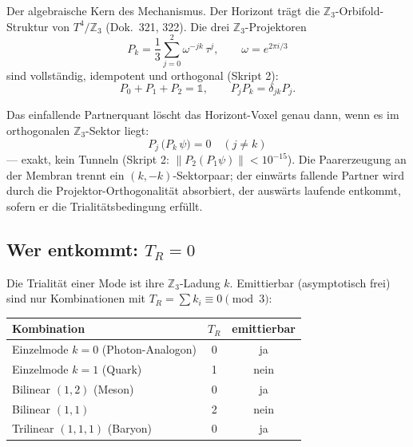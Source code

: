 Der algebraische Kern des Mechanismus. Der Horizont trägt die
$\mathbb{Z}_3$-Orbifold-Struktur von $T^4/\mathbb{Z}_3$ (Dok.\ 321, 322).
Die drei $\mathbb{Z}_3$-Projektoren
\begin{equation}
  P_k = \frac{1}{3}\sum_{j=0}^{2}\omega^{-jk}\,\tau^j,
  \qquad \omega = e^{2\pi i/3}
\end{equation}
sind vollständig, idempotent und orthogonal (Skript 2):
\begin{equation}
  P_0 + P_1 + P_2 = \mathbb{1},\qquad
  P_j P_k = \delta_{jk}P_j.
\end{equation}

\begin{tcolorbox}[ffgftbox, title={Die Absorption \B}]
  Das einfallende Partnerquant löscht das Horizont-Voxel genau dann,
  wenn es im orthogonalen $\mathbb{Z}_3$-Sektor liegt:
  \begin{equation}
    P_j\,\bigl(P_k\,\psi\bigr) = 0 \quad (j \neq k)
  \end{equation}
  — exakt, kein Tunneln (Skript 2: $\|P_2(P_1\psi)\| < 10^{-15}$).
  Die Paarerzeugung an der Membran trennt ein $(k,-k)$-Sektorpaar;
  der einwärts fallende Partner wird durch die Projektor-Orthogonalität
  absorbiert, der auswärts laufende entkommt, sofern er die
  Trialitätsbedingung erfüllt.
\end{tcolorbox}

\subsection{Wer entkommt: \texorpdfstring{$T_R = 0$}{TR=0}}

Die Trialität einer Mode ist ihre $\mathbb{Z}_3$-Ladung $k$.
Emittierbar (asymptotisch frei) sind nur Kombinationen mit
$T_R = \sum k_i \equiv 0 \pmod 3$:

\begin{center}
\small
\begin{tabular}{@{}lcc@{}}
  \toprule
  Kombination & $T_R$ & emittierbar \\
  \midrule
  Einzelmode $k=0$ (Photon-Analogon) & 0 & ja \\
  Einzelmode $k=1$ (Quark) & 1 & nein \\
  Bilinear $(1,2)$ (Meson) & 0 & ja \\
  Bilinear $(1,1)$ & 2 & nein \\
  Trilinear $(1,1,1)$ (Baryon) & 0 & ja \\
  \bottomrule
\end{tabular}
\end{center}

